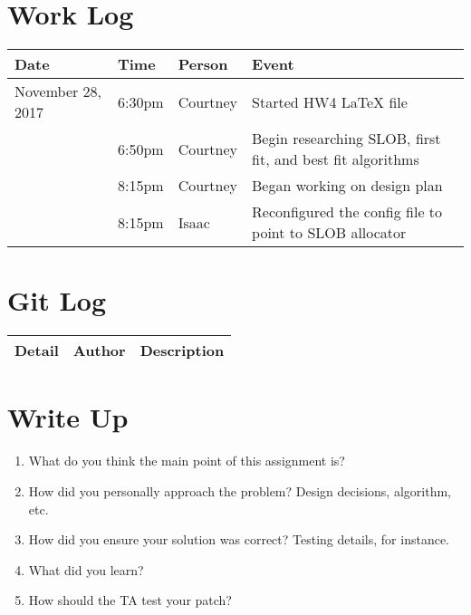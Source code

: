 \documentclass[letterpaper,10pt,draftclsnofoot,onecolumn,titlepage]{IEEEtran}
\begin{document}
\section{Work Log}
\begin{center}
\begin{tabular}{p{3cm}p{1cm}p{1cm}p{10cm} }
 Date  & Time & Person & Event \\ \hline
November 28, 2017 & 6:30pm & Courtney & Started HW4 LaTeX file \\
		  & 6:50pm & Courtney & Begin researching SLOB, first fit, and best fit algorithms \\
		  & 8:15pm & Courtney & Began working on design plan \\
		  & 8:15pm & Isaac & Reconfigured the config file to point to SLOB allocator \\
\end{tabular}
\end{center}

\section{Git Log}
\begin{tabular}{p{2cm} p{2cm} p{10cm}}\textbf{Detail} & \textbf{Author} & \textbf{Description}\\\hline
\end{tabular}

\section{Write Up}
\begin{enumerate}
                \item What do you think the main point of this assignment is? \\
                \item How did you personally approach the problem? Design decisions, algorithm, etc. \\

                \item How did you ensure your solution was correct? Testing details, for instance. \\
                \item What did you learn? \\
		\item How should the TA test your patch? \\
\end{enumerate}
\end{document}
